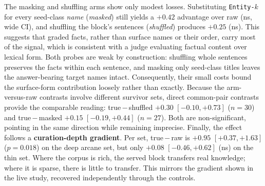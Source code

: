 \documentclass[10pt,twocolumn]{article}
\begin{document}
The masking and shuffling arms show only modest losses. Substituting \texttt{Entity-$k$} for every seed-class \emph{name} (\emph{masked}) still yields a $+0.42$ advantage over raw (ns, wide CI), and shuffling the block's sentences (\emph{shuffled}) produces $+0.25$ (ns). This suggests that graded facts, rather than surface names or their order, carry most of the signal, which is consistent with a judge evaluating factual content over lexical form. Both probes are weak by construction: shuffling whole sentences preserves the facts within each sentence, and masking only seed-class titles leaves the answer-bearing target names intact. Consequently, their small costs bound the surface-form contribution loosely rather than exactly. Because the arm-versus-raw contrasts involve different survivor sets, direct common-pair contrasts provide the comparable reading: true\,$-$\,shuffled $+0.30$ $[-0.10,+0.73]$ ($n=30$) and true\,$-$\,masked $+0.15$ $[-0.19,+0.44]$ ($n=27$). Both are non-significant, pointing in the same direction while remaining imprecise. Finally, the effect follows a \textbf{curation-depth gradient}. Per set, true\,$-$\,raw is $+0.95$ $[+0.37,+1.63]$ ($p=0.018$) on the deep arcane set, but only $+0.08$ $[-0.46,+0.62]$ (ns) on the thin set. Where the corpus is rich, the served block transfers real knowledge; where it is sparse, there is little to transfer. This mirrors the gradient shown in the live study, recovered independently through the controls.
\end{document}
